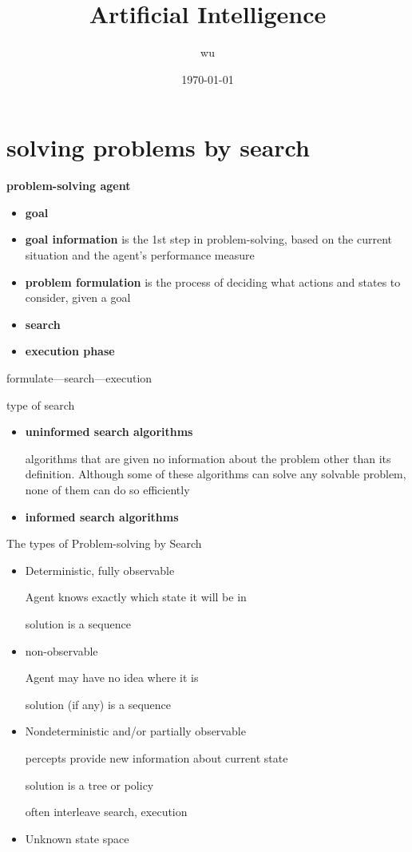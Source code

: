 \documentclass[11pt]{article}
\author{wu}
\date{\today}
\title{Artificial Intelligence}
\begin{document}
\maketitle
\tableofcontents \clearpage\section{solving problems by search}
\label{sec:orgd60f459}
\textbf{problem-solving agent}
\begin{itemize}
\item \textbf{goal}
\item \textbf{goal information} is the 1st step in problem-solving, based on the
current situation and the agent’s performance measure
\item \textbf{problem formulation} is the process of deciding what actions and
states to consider, given a goal
\item \textbf{search}
\item \textbf{execution phase}
\end{itemize}


formulate—search—execution


type of search
\begin{itemize}
\item \textbf{uninformed search algorithms}

algorithms that are given no information about the problem other
than its definition. Although some of these algorithms can solve
any solvable problem, none of them can do so efficiently
\item \textbf{informed search algorithms}
\end{itemize}


The types of Problem-solving by Search
\begin{itemize}
\item Deterministic, fully observable

Agent knows exactly which state it will be in

solution is a sequence
\item non-observable

Agent may have no idea where it is

solution (if any) is a sequence
\item Nondeterministic and/or partially observable

percepts provide new information about current state

solution is a tree or policy

often interleave search, execution
\item Unknown state space
\end{itemize}
\end{document}
